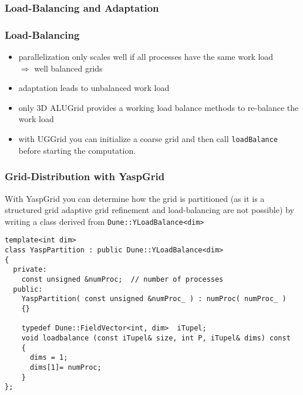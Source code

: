 \subsubsection{Load-Balancing and Adaptation}
\begin{frame}[fragile]
  \frametitle<presentation>{Load-Balancing}
  \begin{itemize}
  \item parallelization only scales well if all processes have the
    same work load\\
    $\Rightarrow$ well balanced grids
  \item adaptation leads to unbalanced work load
  \item only 3D ALUGrid provides a working load balance methods to re-balance the work load
   \item with UGGrid you can initialize a coarse grid and then call \lstinline!loadBalance! before starting the
         computation.
  \end{itemize}
\end{frame}

\begin{frame}[fragile]
  \frametitle{Grid-Distribution with YaspGrid}
With YaspGrid you can determine how the grid is partitioned (as it is a structured grid
adaptive grid refinement and load-balancing are not possible) by writing a class derived from
\lstinline!Dune::YLoadBalance<dim>!

\begin{lstlisting}
template<int dim>
class YaspPartition : public Dune::YLoadBalance<dim>
{
  private:
    const unsigned &numProc;  // number of processes
  public:
    YaspPartition( const unsigned &numProc_ ) : numProc( numProc_ )
    {}

    typedef Dune::FieldVector<int, dim>  iTupel;
    void loadbalance (const iTupel& size, int P, iTupel& dims) const
    {
      dims = 1;
      dims[1]= numProc;
    }
};
\end{lstlisting}
\end{frame}

